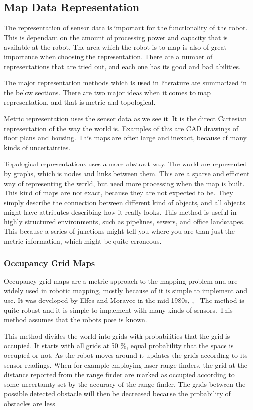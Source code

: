 \subsection{Map Data Representation}
The representation of sensor data is important for the functionality of the robot. This is
dependant on the amount of processing power and capacity that is available at the robot.
The area which the robot is to map is also of great importance when choosing the
representation. There are a number of representations that are tried out, and each one has its good and
bad abilities. 

The major representation methods which is used in literature are summarized in the below
sections. There are two major ideas when it comes to map representation, and that is
metric and topological.

Metric representation uses the sensor data as we see it. It is the direct Cartesian
representation of the way the world is. Examples of this are CAD drawings of floor plans
and housing. This maps are often large and inexact, because of many kinds of
uncertainties.

Topological representations uses a more abstract way. The world are represented by graphs,
which is nodes and links between them. This are a sparse and efficient way of representing
the world, but need more processing when the map is built. This kind of maps are not
exact, because they are not expected to be. They simply describe the connection between
different kind of objects, and all objects might have attributes describing how it really
looks. This method is useful in highly structured environments, such as pipelines, sewers,
and office landscapes. This because a series of junctions might tell you where you are
than just the metric information, which might be quite erroneous. 


\subsubsection{Occupancy Grid Maps}
Occupancy grid maps are a metric approach to the mapping problem and are widely used in 
robotic mapping, mostly because of it is simple to implement and use. It was developed 
by Elfes and Moravec in the mid 1980s, \cite{elfes}, \cite{moravec}. The method is quite 
robust and it is simple to implement with many kinds of sensors. This method assumes that 
the robots pose is known.

This method divides the world into grids with probabilities that the grid is occupied. It
starts with all grids at 50 \%, equal probability that the space is occupied or not. As
the robot moves around it updates the grids according to its sensor readings. When for
example employing laser range finders, the grid at the distance reported from the range
finder are marked as occupied according to some uncertainty set by the accuracy of the
range finder. The grids between the possible detected obstacle will then be decreased
because the probability of obstacles are less. 

